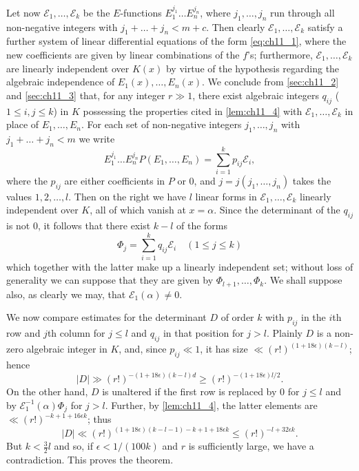 Let now $\mathscr{E}_1, \ldots, \mathscr{E}_k$ be the $E$-functions $E_1^{j_1} \dots E_n^{j_n}$, where $j_1, \ldots, j_n$ run through all non-negative integers with $j_1 + \ldots + j_n < m + c$. Then clearly $\mathscr{E}_1, \ldots, \mathscr{E}_k$ satisfy a further system of linear differential equations of the form \eqref{eq:ch11_1}, where the new coefficients are given by linear combinations of the $f$'s; furthermore, $\mathscr{E}_1, \ldots, \mathscr{E}_k$ are linearly independent over $K(x)$ by virtue of the hypothesis regarding the algebraic independence of $E_1(x), \ldots, E_n(x)$. We conclude from \autoref{sec:ch11_2} and \autoref{sec:ch11_3} that, for any integer $r \gg 1$, there exist algebraic integers $q_{ij}$ ($1 \le i, j \le k$) in $K$ possessing the properties cited in \autoref{lem:ch11_4} with $\mathscr{E}_1, \dots, \mathscr{E}_k$ in place of $E_1, \dots, E_n$. For each set of non-negative integers $j_1, \dots, j_n$ with $j_1 + \ldots + j_n < m$ we write
\[E_1^{j_1} \dots E_n^{j_n} P(E_1, \dots, E_n) = \sum_{i=1}^k p_{ij} \mathscr{E}_i,\]
where the $p_{ij}$ are either coefficients in $P$ or 0, and $j = j(j_1, \ldots, j_n)$ takes the values $1, 2, \ldots, l$. Then on the right we have $l$ linear forms in $\mathscr{E}_1, \dots, \mathscr{E}_k$ linearly independent over $K$, all of which vanish at $x = \alpha$. Since the determinant of the $q_{ij}$ is not 0, it follows that there exist $k - l$ of the forms
\[\Phi_j = \sum_{i=1}^k q_{ij} \mathscr{E}_i \quad (1 \leqslant j \leqslant k)\]
which together with the latter make up a linearly independent set; without loss of generality we can suppose that they are given by $\Phi_{l+1}, \ldots, \Phi_k$. We shall suppose also, as clearly we may, that $\mathscr{E}_1(\alpha) \neq 0$.

We now compare estimates for the determinant $D$ of order $k$ with $p_{ij}$ in the $i$th row and $j$th column for $j \le l$ and $q_{ij}$ in that position for $j > l$. Plainly $D$ is a non-zero algebraic integer in $K$, and, since $p_{ij} \ll 1$, it has size $\ll (r!)^{(1+18\epsilon)(k-l)}$; hence
\[|D| \gg (r!)^{-(1+18\epsilon)(k-l)d} \geqslant (r!)^{-(1+18\epsilon)l/2}.\]
On the other hand, $D$ is unaltered if the first row is replaced by 0 for $j \le l$ and by $\mathscr{E}_1^{-1}(\alpha)\Phi_j$ for $j > l$. Further, by \autoref{lem:ch11_4}, the latter elements are $\ll (r!)^{-k+1+16\epsilon k}$; thus
\[|D| \ll (r!)^{(1+18\epsilon)(k-l-1)-k+1+18\epsilon k} \leqslant (r!)^{-l+32\epsilon k}.\]
But $k < \frac{3}{2} l$ and so, if $\epsilon < 1/(100k)$ and $r$ is sufficiently large, we have a contradiction. This proves the theorem.

